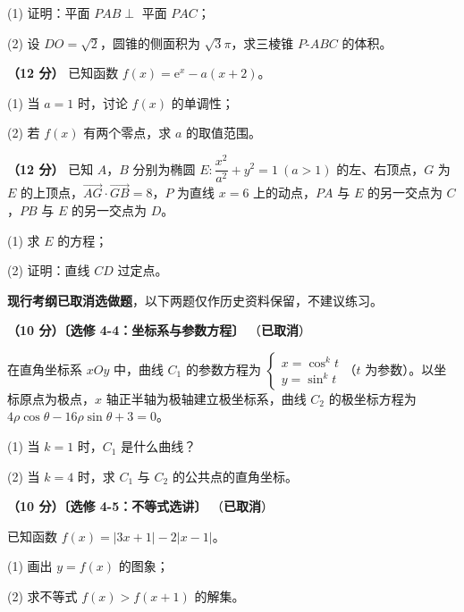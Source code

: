   (1) 证明：平面 $PAB\perp$ 平面 $PAC$；

  (2) 设 $DO=\sqrt2$，圆锥的侧面积为 $\sqrt3\pi$，求三棱锥 $P\text{-}ABC$ 的体积。

\textbf{（12 分）} 已知函数 $f(x)=\mathrm e^{x}-a(x+2)$。

  (1) 当 $a=1$ 时，讨论 $f(x)$ 的单调性；

  (2) 若 $f(x)$ 有两个零点，求 $a$ 的取值范围。

\textbf{（12 分）} 已知 $A$，$B$ 分别为椭圆 $E:\dfrac{x^{2}}{a^{2}}+y^{2}=1\ (a>1)$ 的左、右顶点，$G$ 为 $E$ 的上顶点，$\overrightarrow{AG}\cdot\overrightarrow{GB}=8$，$P$ 为直线 $x=6$ 上的动点，$PA$ 与 $E$ 的另一交点为 $C$，$PB$ 与 $E$ 的另一交点为 $D$。

  (1) 求 $E$ 的方程；

  (2) 证明：直线 $CD$ 过定点。

\par\medskip


\begin{gktip}
\textbf{ 现行考纲已取消选做题}，以下两题仅作历史资料保留，不建议练习。
\end{gktip}

\textbf{（10 分）〔选修 4-4：坐标系与参数方程〕} （\textbf{已取消}）

在直角坐标系 $xOy$ 中，曲线 $C_1$ 的参数方程为 $\begin{cases}x=\cos^{k}t\\ y=\sin^{k}t\end{cases}$（$t$ 为参数）。以坐标原点为极点，$x$ 轴正半轴为极轴建立极坐标系，曲线 $C_2$ 的极坐标方程为 $4\rho\cos\theta-16\rho\sin\theta+3=0$。

  (1) 当 $k=1$ 时，$C_1$ 是什么曲线？

  (2) 当 $k=4$ 时，求 $C_1$ 与 $C_2$ 的公共点的直角坐标。

\textbf{（10 分）〔选修 4-5：不等式选讲〕} （\textbf{已取消}）

已知函数 $f(x)=|3x+1|-2|x-1|$。

  (1) 画出 $y=f(x)$ 的图象；

  (2) 求不等式 $f(x)>f(x+1)$ 的解集。

\par\medskip

